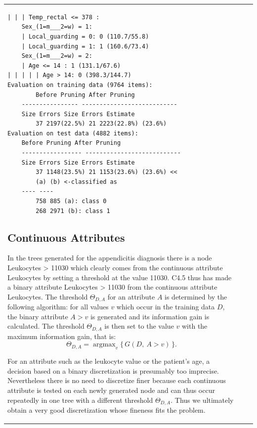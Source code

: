 \documentclass[10pt]{book}
\begin{document}
\begin{center}
\begin{tabular}{|l|l|l|}
\begin{verbatim}
| | | Temp_rectal <= 378 :
    Sex_(1=m___2=w) = 1:
    | Local_guarding = 0: 0 (110.7/55.8)
    | Local_guarding = 1: 1 (160.6/73.4)
    Sex_(1=m___2=w) = 2:
    | Age <= 14 : 1 (131.1/67.6)
| | | | | Age > 14: 0 (398.3/144.7)
Evaluation on training data (9764 items):
        Before Pruning After Pruning
    ---------------- ---------------------------
    Size Errors Size Errors Estimate
        37 2197(22.5%) 21 2223(22.8%) (23.6%)
Evaluation on test data (4882 items):
    Before Pruning After Pruning
    ----------------- ---------------------------
    Size Errors Size Errors Estimate
        37 1148(23.5%) 21 1153(23.6%) (23.6%) <<
        (a) (b) <-classified as
    ---- ----
        758 885 (a): class 0
        268 2971 (b): class 1
\end{verbatim}

\subsection{Continuous Attributes}
In the trees generated for the appendicitis diagnosis there is a node Leukocytes > 11030 which clearly comes from the continuous attribute Leukocytes by setting a threshold at the value 11030. C4.5 thus has made a binary attribute Leukocytes > 11030 from the continuous attribute Leukocytes. The threshold $\Theta_{D,A}$ for an attribute $A$ is determined by the following algorithm: for all values $v$ which occur in the training data $D$, the binary attribute $A>v$ is generated and its information gain is calculated. The threshold $\Theta_{D,A}$ is then set to the value $v$ with the maximum information gain, that is:
$$
\Theta_{D,A} = \operatorname{argmax}_{v}\{\, G(D,\ A>v) \,\}.
$$

For an attribute such as the leukocyte value or the patient's age, a decision based on a binary discretization is presumably too imprecise. Nevertheless there is no need to discretize finer because each continuous attribute is tested on each newly generated node and can thus occur repeatedly in one tree with a different threshold $\Theta_{D,A}$. Thus we ultimately obtain a very good discretization whose fineness fits the problem.


\end{tabular}
\end{center}
\end{document}
